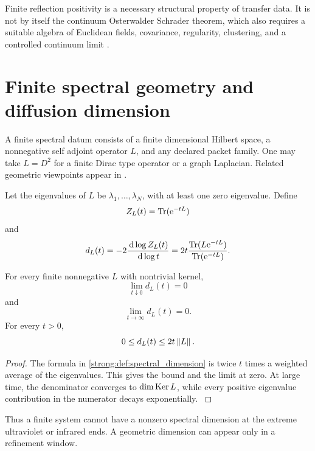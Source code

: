 Finite reflection positivity is a necessary structural property of transfer data. It is not by itself the continuum Osterwalder Schrader theorem, which also requires a suitable algebra of Euclidean fields, covariance, regularity, clustering, and a controlled continuum limit \cite{OsterwalderSchrader1973,OsterwalderSchrader1975,GlimmJaffe1987}.

\section{Finite spectral geometry and diffusion dimension}\label{strong:section:011}\label{strong:sec:spectral_geometry}

A finite spectral datum consists of a finite dimensional Hilbert space, a nonnegative self adjoint operator \(L\), and any declared packet family. One may take \(L=D^2\) for a finite Dirac type operator or a graph Laplacian. Related geometric viewpoints appear in \cite{Connes1994,Vassilevich2003}.

\begin{definition}\label{strong:definition:008}\label{strong:def:spectral_dimension}
Let the eigenvalues of \(L\) be \(\lambda_1,\ldots,\lambda_N\), with at least one zero eigenvalue. Define
\[
Z_L(t)=\operatorname{Tr}(\mathrm e^{-tL})
\]
and
\[
d_L(t)
=-2\frac{\,\mathrm d\log Z_L(t)}{\,\mathrm d\log t}
=
2t
\frac{\operatorname{Tr}(L\mathrm e^{-tL})}{\operatorname{Tr}(\mathrm e^{-tL})}.
\]
\end{definition}

\begin{proposition}\label{strong:proposition:009}\label{strong:prop:finite_spectral_limits}
For every finite nonnegative \(L\) with nontrivial kernel,
\[
\lim_{t\downarrow0}d_L(t)=0
\]
and
\[
\lim_{t\to\infty}d_L(t)=0.
\]
For every \(t>0\),
\[
0\leq d_L(t)\leq2t\left\lVert L\right\rVert.
\]
\end{proposition}

\begin{proof}\label{strong:proof:062}
The formula in \cref{strong:def:spectral_dimension} is twice \(t\) times a weighted average of the eigenvalues. This gives the bound and the limit at zero. At large time, the denominator converges to \(\dim\operatorname{Ker} L\), while every positive eigenvalue contribution in the numerator decays exponentially.
\label{strong:proof:062:end}\end{proof}

Thus a finite system cannot have a nonzero spectral dimension at the extreme ultraviolet or infrared ends. A geometric dimension can appear only in a refinement window.

